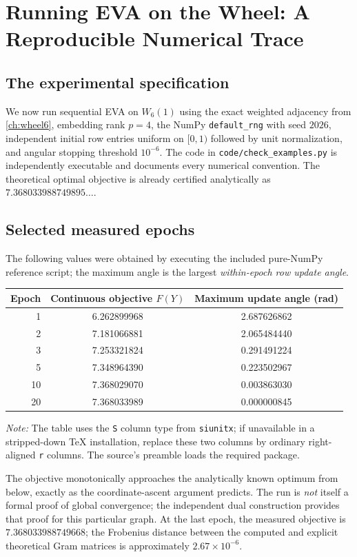 \chapter{Running EVA on the Wheel: A Reproducible Numerical Trace}\label{ch:trace}
\section{The experimental specification}
We now run sequential EVA on $W_6(1)$ using the exact weighted adjacency from \cref{ch:wheel6}, embedding rank $p=4$, the NumPy \texttt{default\_rng} with seed $2026$, independent initial row entries uniform on $[0,1)$ followed by unit normalization, and angular stopping threshold $10^{-6}$. The code in \texttt{code/check\_examples.py} is independently executable and documents every numerical convention. The theoretical optimal objective is already certified analytically as $7.368033988749895\ldots$.

\section{Selected measured epochs}
The following values were obtained by executing the included pure-NumPy reference script; the maximum angle is the largest \emph{within-epoch row update angle}.
\begin{center}\small
\begin{tabular}{r S[table-format=1.9] S[table-format=1.9]}
\toprule
Epoch & {Continuous objective $F(Y)$} & {Maximum update angle (rad)}\\ & 6.262899968 & 2.687626862\\
2 & 7.181066881 & 2.065484440\\
3 & 7.253321824 & 0.291491224\\
5 & 7.348964390 & 0.223502967\\
10 & 7.368029070 & 0.003863030\\
20 & 7.368033989 & 0.000000845\\
\bottomrule
\end{tabular}
\end{center}
\noindent\textit{Note:} The table uses the \texttt{S} column type from \texttt{siunitx}; if unavailable in a stripped-down TeX installation, replace these two columns by ordinary right-aligned \texttt{r} columns. The source's preamble loads the required package.

The objective monotonically approaches the analytically known optimum from below, exactly as the coordinate-ascent argument predicts. The run is \emph{not} itself a formal proof of global convergence; the independent dual construction provides that proof for this particular graph. At the last epoch, the measured objective is $7.368033988749668$; the Frobenius distance between the computed and explicit theoretical Gram matrices is approximately $2.67\times10^{-6}$.

